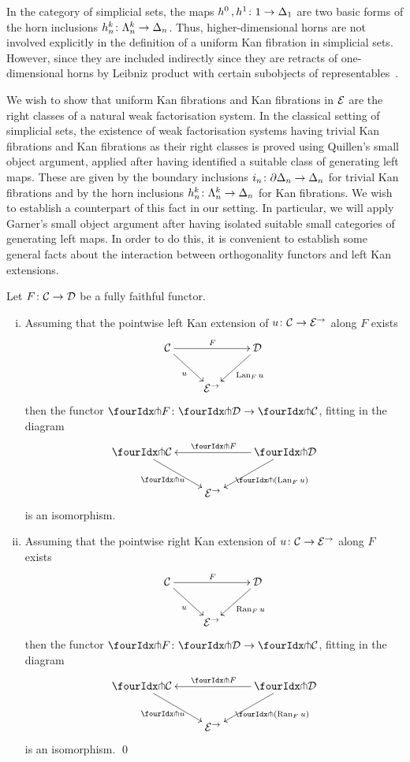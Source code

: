 \documentclass[reqno,10pt,a4paper,oneside]{amsart}
\begin{document}
 \begin{remark} In the category of simplicial sets, the maps $h^0 \, , h^1 \co 1 \to \Delta_1$ are two basic forms of the horn
 inclusions $h^k_n \co \Lambda^k_n \to \Delta_n$.  Thus, higher-dimensional horns are not involved
 explicitly in the definition of a uniform Kan fibration in simplicial sets. However, 
  since they are included indirectly since they are  retracts of one-dimensional horns by Leibniz product 
  with certain subobjects of representables~\cite{joyal-quaderns}.
  \end{remark} 
 
We wish to show that uniform Kan fibrations and Kan fibrations in $\cal{E}$ are the
right classes of a natural weak factorisation system. In the classical setting of 
simplicial sets, the existence of weak factorisation systems having trivial Kan fibrations
and Kan fibrations as their right classes is proved using Quillen's small object argument,
applied after having identified a suitable class of generating left maps. These are given
by the boundary inclusions $i_n \co \partial \Delta_n \to \Delta_n$ for trivial Kan fibrations
and by the horn inclusions $h^k_n \co \Lambda^k_n \to \Delta_n$ for Kan fibrations. 
We wish to establish a counterpart of  this fact in our setting. In particular,
we will apply Garner's small object argument after having isolated suitable
small categories of generating left maps. In order to do this, it is convenient
to establish some general facts about the interaction between orthogonality 
functors and left Kan extensions. 

\begin{proposition} Let $F \co \cal{C} \to \cal{D}$ be a fully faithful functor. 
\label{kan-extension-closure}
\begin{enumerate}[(i)]
\item Assuming that the pointwise left Kan extension of 
$u \co \cal{C} \to \catE^{\to}$ along $F$ exists
\[
\xymatrix{
  \cal{C}
  \ar[dr]_{u}
  \ar[rr]^{F}
&&
  \cal{D}
  \ar[dl]^{\Lan_F u}
\\&
  \catE^{\to}
}
\]
then the functor $\liftr{F} \co \liftr{\cal{D}} \to \liftr{\cal{C}}$,  fitting in the diagram
\[
\xymatrix{
  \liftr{\cal{C}}
  \ar[dr]_{\liftr{u}}
&&
  \liftr{\cal{D}}
  \ar[ll]_{\liftr{F}}
  \ar[dl]^{\liftr{(\Lan_F u)}}
\\&
  \catE^{\to}
}
\]
is an isomorphism.
\item Assuming that the pointwise right Kan extension of 
$u \co \cal{C} \to \catE^{\to}$ along $F$ exists
\[
\xymatrix{
  \cal{C}
  \ar[dr]_{u}
  \ar[rr]^{F}
&&
  \cal{D}
  \ar[dl]^{\Ran_F u}
\\&
  \catE^{\to}
}
\]
then the functor $\liftl{F} \co \liftl{\cal{D}} \to \liftl{\cal{C}}$, fitting in the diagram
\[
\xymatrix{
  \liftl{\cal{C}}
  \ar[dr]_{\liftl{u}}
&&
  \liftl{\cal{D}}
  \ar[ll]_{\liftl{F}}
  \ar[dl]^{\liftl{(\Ran_F u)}}
\\&
  \catE^{\to}
}
\]
is an isomorphism. \qed
\end{enumerate}
\end{proposition}
\end{document}
